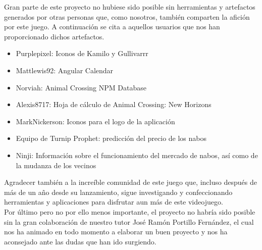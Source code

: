 
Gran parte de este proyecto no hubiese sido posible sin herramientas y artefactos generados por otras personas que, como nosotros, también comparten la afición por este juego. A continuación se cita a aquellos usuarios que nos han proporcionado dichos artefactos.

\begin{itemize}
	\item Purplepixel: Iconos de Kamilo y Gullivarrr
	\item Mattlewis92: Angular Calendar
	\item Norviah: Animal Crossing NPM Database
	\item Alexis8717: Hoja de cálculo de Animal Crossing: New Horizons
	\item MarkNickerson: Iconos para el logo de la aplicación
	\item Equipo de Turnip Prophet: predicción del precio de los nabos
	\item Ninji: Información sobre el funcionamiento del mercado de nabos, así como de la mudanza de los vecinos
\end{itemize}

Agradecer también a la increíble comunidad de este juego que, incluso después de más de un año desde su lanzamiento, sigue investigando y confeccionando herramientas y aplicaciones para disfrutar aun más de este videojuego.\\

Por último pero no por ello menos importante, el proyecto no habría sido posible sin la gran colaboración de nuestro tutor José Ramón Portillo Fernández, el cual nos ha animado en todo momento a elaborar un buen proyecto y nos ha aconsejado ante las dudas que han ido surgiendo.\\

